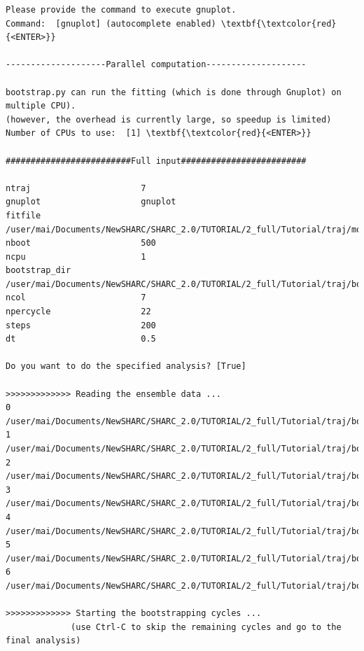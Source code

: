 \documentclass[a4paper,11pt,DIV=15,openany]{scrbook}
\begin{document}
\begin{oframed}
\begin{Verbatim}[commandchars=\\\{\}]
Please provide the command to execute gnuplot.
Command:  [gnuplot] (autocomplete enabled) \textbf{\textcolor{red}{<ENTER>}}

--------------------Parallel computation--------------------

bootstrap.py can run the fitting (which is done through Gnuplot) on multiple CPU).
(however, the overhead is currently large, so speedup is limited)
Number of CPUs to use:  [1] \textbf{\textcolor{red}{<ENTER>}}

#########################Full input#########################

ntraj                      7
gnuplot                    gnuplot
fitfile                    /user/mai/Documents/NewSHARC/SHARC_2.0/TUTORIAL/2_full/Tutorial/traj/model_fit.gp
nboot                      500
ncpu                       1
bootstrap_dir              /user/mai/Documents/NewSHARC/SHARC_2.0/TUTORIAL/2_full/Tutorial/traj/bootstrap_data
ncol                       7
npercycle                  22
steps                      200
dt                         0.5

Do you want to do the specified analysis? [True] 

>>>>>>>>>>>>> Reading the ensemble data ...
0 /user/mai/Documents/NewSHARC/SHARC_2.0/TUTORIAL/2_full/Tutorial/traj/bootstrap_data/pop_1.dat
1 /user/mai/Documents/NewSHARC/SHARC_2.0/TUTORIAL/2_full/Tutorial/traj/bootstrap_data/pop_2.dat
2 /user/mai/Documents/NewSHARC/SHARC_2.0/TUTORIAL/2_full/Tutorial/traj/bootstrap_data/pop_3.dat
3 /user/mai/Documents/NewSHARC/SHARC_2.0/TUTORIAL/2_full/Tutorial/traj/bootstrap_data/pop_4.dat
4 /user/mai/Documents/NewSHARC/SHARC_2.0/TUTORIAL/2_full/Tutorial/traj/bootstrap_data/pop_5.dat
5 /user/mai/Documents/NewSHARC/SHARC_2.0/TUTORIAL/2_full/Tutorial/traj/bootstrap_data/pop_6.dat
6 /user/mai/Documents/NewSHARC/SHARC_2.0/TUTORIAL/2_full/Tutorial/traj/bootstrap_data/pop_7.dat

>>>>>>>>>>>>> Starting the bootstrapping cycles ...
             (use Ctrl-C to skip the remaining cycles and go to the final analysis)


\end{Verbatim}
\end{oframed}
\end{document}
